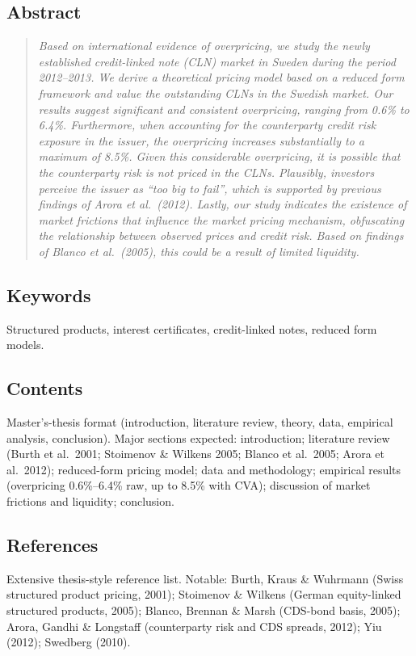\documentclass[11pt,a4paper]{article}
\begin{document}
\subsection*{Abstract}
\begin{quote}\itshape
Based on international evidence of overpricing, we study the newly
established credit-linked note (CLN) market in Sweden during the
period 2012--2013. We derive a theoretical pricing model based on a
reduced form framework and value the outstanding CLNs in the Swedish
market. Our results suggest significant and consistent overpricing,
ranging from 0.6\% to 6.4\%. Furthermore, when accounting for the
counterparty credit risk exposure in the issuer, the overpricing
increases substantially to a maximum of 8.5\%. Given this considerable
overpricing, it is possible that the counterparty risk is not priced
in the CLNs. Plausibly, investors perceive the issuer as ``too big to
fail'', which is supported by previous findings of Arora et al.\
(2012). Lastly, our study indicates the existence of market frictions
that influence the market pricing mechanism, obfuscating the
relationship between observed prices and credit risk. Based on
findings of Blanco et al.\ (2005), this could be a result of limited
liquidity.
\end{quote}

\subsection*{Keywords}
Structured products, interest certificates, credit-linked notes, reduced form models.

\subsection*{Contents}
Master's-thesis format (introduction, literature review, theory,
data, empirical analysis, conclusion). Major sections expected:
introduction; literature review (Burth et al.\ 2001; Stoimenov \&
Wilkens 2005; Blanco et al.\ 2005; Arora et al.\ 2012); reduced-form
pricing model; data and methodology; empirical results
(overpricing 0.6\%--6.4\% raw, up to 8.5\% with CVA); discussion of
market frictions and liquidity; conclusion.

\subsection*{References}
Extensive thesis-style reference list. Notable: Burth, Kraus \&
Wuhrmann (Swiss structured product pricing, 2001); Stoimenov \&
Wilkens (German equity-linked structured products, 2005); Blanco,
Brennan \& Marsh (CDS-bond basis, 2005); Arora, Gandhi \& Longstaff
(counterparty risk and CDS spreads, 2012); Yiu (2012); Swedberg
(2010).
\end{document}
